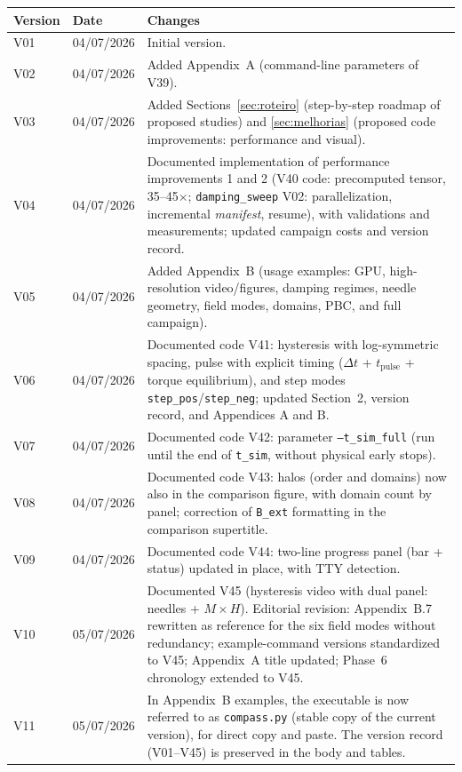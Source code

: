 \documentclass[11pt,a4paper]{article}
\newcommand{\code}[1]{\texttt{#1}}
\begin{document}
\begin{tabular}{@{}lll@{}}
\toprule
\textbf{Version} & \textbf{Date} & \textbf{Changes} \\
\midrule
V01 & 04/07/2026 & Initial version. \\
V02 & 04/07/2026 & Added Appendix~A (command-line parameters of V39). \\
V03 & 04/07/2026 & Added Sections~\ref{sec:roteiro} (step-by-step roadmap of proposed studies) and \ref{sec:melhorias} (proposed code improvements: performance and visual). \\
V04 & 04/07/2026 & Documented implementation of performance improvements 1 and 2 (V40 code: precomputed tensor, 35--45$\times$; \code{damping\_sweep} V02: parallelization, incremental \emph{manifest}, resume), with validations and measurements; updated campaign costs and version record. \\
V05 & 04/07/2026 & Added Appendix~B (usage examples: GPU, high-resolution video/figures, damping regimes, needle geometry, field modes, domains, PBC, and full campaign). \\
V06 & 04/07/2026 & Documented code V41: hysteresis with log-symmetric spacing, pulse with explicit timing ($\Delta t$ + $t_{\mathrm{pulse}}$ + torque equilibrium), and step modes \code{step\_pos}/\code{step\_neg}; updated Section~2, version record, and Appendices A and B. \\
V07 & 04/07/2026 & Documented code V42: parameter \code{--t\_sim\_full} (run until the end of \code{t\_sim}, without physical early stops). \\
V08 & 04/07/2026 & Documented code V43: halos (order and domains) now also in the comparison figure, with domain count by panel; correction of \code{B\_ext} formatting in the comparison supertitle. \\
V09 & 04/07/2026 & Documented code V44: two-line progress panel (bar + status) updated in place, with TTY detection. \\
V10 & 05/07/2026 & Documented V45 (hysteresis video with dual panel: needles + $M\times H$). Editorial revision: Appendix~B.7 rewritten as reference for the six field modes without redundancy; example-command versions standardized to V45; Appendix~A title updated; Phase~6 chronology extended to V45. \\
V11 & 05/07/2026 & In Appendix~B examples, the executable is now referred to as \code{compass.py} (stable copy of the current version), for direct copy and paste. The version record (V01--V45) is preserved in the body and tables. \\

\end{tabular}
\end{document}
